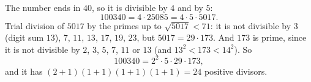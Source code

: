 The number ends in $40$, so it is divisible by $4$ and by $5$:
\[
100340=4\cdot25085=4\cdot5\cdot5017 .
\]
Trial division of $5017$ by the primes up to $\sqrt{5017}<71$: it is not divisible by $3$ (digit sum $13$), $7$, $11$, $13$, $17$, $19$, $23$, but $5017=29\cdot173$. And $173$ is prime, since it is not divisible by $2$, $3$, $5$, $7$, $11$ or $13$ (and $13^2<173<14^2$). So
\[
100340=\boxed{2^2\cdot5\cdot29\cdot173},
\]
and it has $(2+1)(1+1)(1+1)(1+1)=\boxed{24}$ positive divisors.
